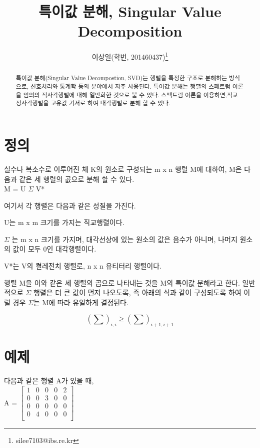 \documentclass[a4paper,
              ]{jacow}
\begin{document}
\title{특이값 분해, Singular Value Decomposition}
\author{이상일(학번, 201460437)\thanks{silee7103@ibs.re.kr}\\
       }
\maketitle

%
\begin{abstract}
   특이값 분해(Singular Value Decompostion, SVD)는 행렬을 특정한 구조로 분해하는 방식으로, 신호처리와 통계학 등의 분야에서 자주 사용된다. 특이값 분해는 행렬의 스페트럼 이론을 임의의 직사각행렬에 대해 일반화한 것으로 불 수 있다. 스펙트럼 이론을 이용하면,직교 정사각행렬을 고유값 기저로 하여 대각행렬로 분해 할 수 있다.\cite{SVD}
\end{abstract}


\section{정의}
실수나 복소수로 이루어진 체 K의 원소로 구성되는 m x n 행렬 M에 대하여, M은 다음과 같은 세 행렬의 곲으로 분해 할 수 있다.\\

\qquad M = U $\Sigma$ V* 
\newline

여기서 각 행렬은 다음과 같은 성질을 가진다.
\begin{Itemize}
	\item U는 m x m 크기를 가지는 직교행렬이다.
	\item $\Sigma$ 는 m x n 크기를 가지며, 대각선상에 있는 원소의 값은 음수가 아니며, 나머지 원소의 값이 모두 0인 대각행렬이다.
	\item V*는 V의 켤레전치 행렬로, n x n 유티터리 행렬이다.
\end{Itemize}
행렬 M을 이와 같은 세 행렬의 곱으로 나타내는 것을 M의 특이값 분해라고 한다.
일반적으로  $\Sigma$ 행렬은 더 큰 값이 먼저 나오도록, 즉 아래의 식과 같이 구성되도록 하여 이럴 경우 $\Sigma$는 M에 따라 유일하게 결정된다.

\begin {equation}
\left(\displaystyle\sum\right)_{i,i} \ge \left(\displaystyle\sum\right)_{i+1,i+1}
\end {equation}

\section{예제}
다음과 같은 행렬 A가 있을 때, \\
 A = $
\begin{bmatrix}
1 & 0 & 0 & 0 & 2\\
0 & 0 & 3 & 0 & 0\\
0 & 0 & 0 & 0 & 0\\
0 & 4 & 0 & 0 & 0\\
\end{bmatrix}$ \\
\end{document}
